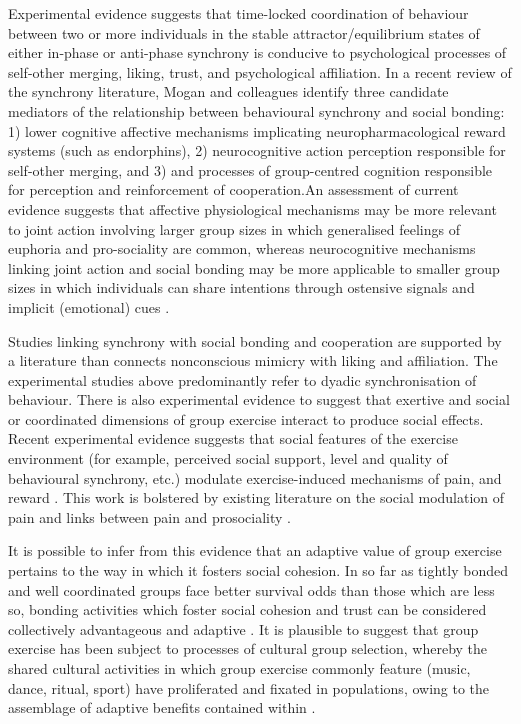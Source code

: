 Experimental evidence suggests that time-locked coordination of behaviour between two or more individuals in the stable attractor/equilibrium states of either in-phase or anti-phase synchrony is conducive to psychological processes of self-other merging, liking, trust, and psychological affiliation. In a recent review of the synchrony literature, Mogan and colleagues
identify three candidate mediators of the relationship between behavioural synchrony and social bonding: 1) lower cognitive affective mechanisms implicating neuropharmacological reward systems (such as endorphins), 2) neurocognitive action perception responsible for  self-other merging, and 3) and processes of group-centred cognition responsible for perception and reinforcement of cooperation.An assessment of current evidence suggests that affective physiological mechanisms may be more relevant to joint action involving larger group sizes in which generalised feelings of euphoria and pro-sociality are common, whereas neurocognitive mechanisms linking joint action and social bonding may be more applicable to smaller group sizes in which individuals can share intentions through ostensive signals and implicit (emotional) cues \citep{Semin2008,Frith2010}.

Studies linking synchrony with social bonding and cooperation are supported by a literature than connects nonconscious mimicry with liking and affiliation\citep{VanBaaren2009}.  The experimental studies above predominantly refer to dyadic synchronisation of behaviour.   There is also experimental evidence to suggest that exertive and social or coordinated dimensions of group exercise interact to produce social effects.  Recent experimental evidence suggests that social features of the exercise environment (for example, perceived social support, level and quality of behavioural synchrony, etc.) modulate exercise-induced mechanisms of pain, and reward \citep{Cohen2009,Sullivan2014,Tarr2015,Davis2015,Weinstein2016}. This work is bolstered by existing literature on the social modulation of pain \citep{Eisenberger2012a} and links between pain and prosociality \citep{Bastian2014a}.



It is possible to infer from this evidence that an adaptive value of group exercise pertains to the way in which it fosters social cohesion.  In so far as tightly bonded and well coordinated groups face better survival odds than those which are less so, bonding activities which foster social cohesion and trust can be considered collectively advantageous and adaptive \citep{Dunbar2010}.  It is plausible to suggest that group exercise has been subject to processes of cultural group selection, whereby the shared cultural activities in which group exercise commonly feature (music, dance, ritual, sport) have proliferated and fixated in populations, owing to the assemblage of adaptive benefits contained within \citep{Dunbar2010,Whitehouse2004,Atkinson2011a}.

